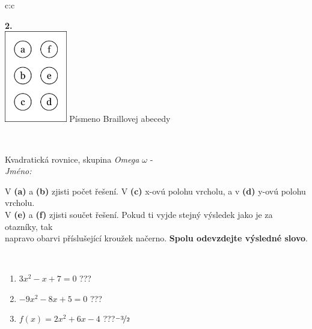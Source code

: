 \documentclass[10pt]{report}
\begin{document}
\begin{tabular}{c:c}
\begin{minipage}[c][104.5mm][t]{0.5\linewidth}
\begin{center}
\begin{minipage}{0.20\linewidth}
\begin{center}
{\Huge\bfseries 2.} \\[2mm]
\includegraphics[height=40mm]{../images/braille.png}
{\small Písmeno Braillovej abecedy}
\end{center}
\end{minipage}
\end{center}
\end{minipage}
\\ \hdashline
\begin{minipage}[c][104.5mm][t]{0.5\linewidth}
\begin{center}
\vspace{7mm}
{\huge Kvadratická rovnice, skupina \textit{Omega $\omega$} -}\\[5mm]
\textit{Jméno:}\phantom{xxxxxxxxxxxxxxxxxxxxxxxxxxxxxxxxxxxxxxxxxxxxxxxxxxxxxxxxxxxxxxxxx}\\[5mm]
\begin{minipage}{0.95\linewidth}
\begin{center}
V \textbf{(a)} a \textbf{(b)} zjisti počet řešení. V \textbf{(c)} x-ovú polohu vrcholu, a v \textbf{(d)} y-ovú polohu vrcholu.\\V \textbf{(e)} a \textbf{(f)} zjisti součet řešení. Pokud ti vyjde stejný výsledek jako je za otazníky, tak\\napravo obarvi příslušející kroužek načerno. \textbf{Spolu odevzdejte výsledné slovo}.
\end{center}
\end{minipage}
\\[1mm]
\begin{minipage}{0.79\linewidth}
\begin{center}
\begin{varwidth}{\linewidth}
\begin{enumerate}
\Large
\item $3x^2-x+7=0$\quad \dotfill\; ???\;\dotfill {}
\item $-9x^2-8x+5=0$\quad \dotfill\; ???\;\dotfill {}
\item $f(x)=2x^2+6x-4$\quad \dotfill\; ???\;\dotfill \quad $\nicefrac{-3}{2}$

\end{enumerate}
\end{varwidth}
\end{center}
\end{minipage}
\end{center}
\end{minipage}
\end{tabular}
\end{document}
